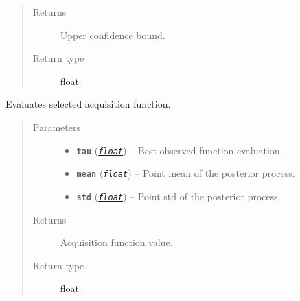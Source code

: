 \documentclass[letterpaper,10pt,english]{sphinxmanual}
\begin{document}
\begin{fulllineitems}
\begin{fulllineitems}
\begin{quote}
\begin{description}
\begin{itemize}
\end{itemize}

\item[{Returns}] \leavevmode
Upper confidence bound.

\item[{Return type}] \leavevmode
\href{https://docs.python.org/2/library/functions.html\#float}{float}

\end{description}\end{quote}

\end{fulllineitems}


\begin{fulllineitems}
\label{pyGPGO.acquisition:pyGPGO.acquisition.Acquisition.eval}
Evaluates selected acquisition function.
\begin{quote}\begin{description}
\item[{Parameters}] \leavevmode\begin{itemize}
\item {} 
\textbf{\texttt{tau}} (\href{https://docs.python.org/2/library/functions.html\#float}{\emph{\texttt{float}}}) -- Best observed function evaluation.

\item {} 
\textbf{\texttt{mean}} (\href{https://docs.python.org/2/library/functions.html\#float}{\emph{\texttt{float}}}) -- Point mean of the posterior process.

\item {} 
\textbf{\texttt{std}} (\href{https://docs.python.org/2/library/functions.html\#float}{\emph{\texttt{float}}}) -- Point std of the posterior process.

\end{itemize}

\item[{Returns}] \leavevmode
Acquisition function value.

\item[{Return type}] \leavevmode
\href{https://docs.python.org/2/library/functions.html\#float}{float}

\end{description}\end{quote}

\end{fulllineitems}


\end{fulllineitems}
\end{document}
